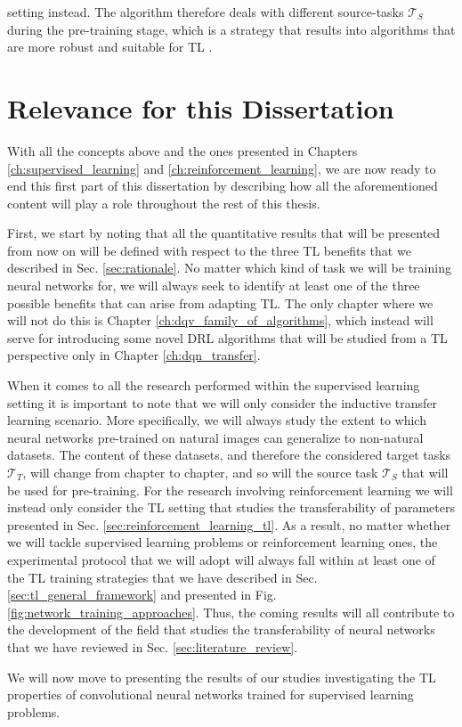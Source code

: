 setting instead. The algorithm therefore deals with different source-tasks $\mathcal{T}_S$ during the pre-training stage, which is a strategy that results into algorithms that are more robust and suitable for TL \cite{kirkpatrick2017overcoming}.  


\section{Relevance for this Dissertation}
\label{sec:relevance}

With all the concepts above and the ones presented in Chapters \ref{ch:supervised_learning} and \ref{ch:reinforcement_learning}, we are now ready to end this first part of this dissertation by describing how all the aforementioned content will play a role throughout the rest of this thesis. 

First, we start by noting that all the quantitative results that will be presented from now on will be defined with respect to the three TL benefits that we described in Sec. \ref{sec:rationale}. No matter which kind of task we will be training neural networks for, we will always seek to identify at least one of the three possible benefits that can arise from adapting TL. The only chapter where we will not do this is Chapter \ref{ch:dqv_family_of_algorithms}, which instead will serve for introducing some novel DRL algorithms that will be studied from a TL perspective only in Chapter \ref{ch:dqn_transfer}.

When it comes to all the research performed within the supervised learning setting it is important to note that we will only consider the inductive transfer learning scenario. More specifically, we will always study the extent to which neural networks pre-trained on natural images can generalize to non-natural datasets. The content of these datasets, and therefore the considered target tasks $\mathcal{T}_T$, will change from chapter to chapter, and so will the source task $\mathcal{T}_S$ that will be used for pre-training. For the research involving reinforcement learning we will instead only consider the TL setting that studies the transferability of parameters presented in Sec. \ref{sec:reinforcement_learning_tl}. As a result, no matter whether we will tackle supervised learning problems or reinforcement learning ones, the experimental protocol that we will adopt will always fall within at least one of the TL training strategies that we have described in Sec. \ref{sec:tl_general_framework} and presented in Fig. \ref{fig:network_training_approaches}. Thus, the coming results will all contribute to the development of the field that studies the transferability of neural networks that we have reviewed in Sec. \ref{sec:literature_review}.

We will now move to presenting the results of our studies investigating the TL properties of convolutional neural networks trained for supervised learning problems.
